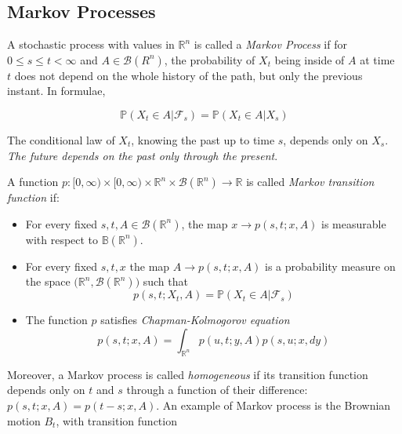 \subsection{Markov Processes}
A stochastic process with values in $\mathbb{R}^n$ is called a \textit{Markov Process} if for $0 \leq s \leq t < \infty$ and $A \in \mathcal{B}(R^n)$, the probability of $X_t$ being inside of $A$ at time $t$ does not depend on the whole history of the path, but only the previous instant. In formulae,

\begin{equation}
    \mathbb{P}(X_t \in A \vert \mathcal{F}_s) = \mathbb{P}(X_t \in A \vert X_s)
\end{equation}

The conditional law of $X_t$, knowing the past up to time $s$, depends only on $X_s$. \textit{The future depends on the past only through the present}. 

\begin{definition}
    A function $p : [0,\infty) \times [0,\infty) \times \mathbb{R}^n \times \mathcal{B}(\mathbb{R}^n) \to \mathbb{R}$ is called \textit{Markov transition function} if:
    \begin{itemize}
        \item For every fixed $s,t, A \in \mathcal{B}(\mathbb{R}^n)$, the map $x \to p(s,t;x,A)$ is measurable with respect to $\mathbb{B}(\mathbb{R}^n)$. 
        \item For every fixed $s,t,x$ the map $A \to p(s,t;x,A)$ is a probability measure on the space $\big(\mathbb{R}^n, \mathcal{B}(\mathbb{R}^n)\big)$ such that
        \begin{equation}
            p(s,t;X_t,A) = \mathbb{P}(X_t \in A \vert \mathcal{F}_s)
        \end{equation}
        \item The function $p$ satisfies \textit{Chapman-Kolmogorov equation}
        \begin{equation}
            p(s,t;x,A) = \int_{\mathbb{R}^n} p(u,t;y,A) p(s,u;x,dy)
        \end{equation}
    \end{itemize}
\end{definition}

Moreover, a Markov process is called \textit{homogeneous} if its transition function depends only on $t$ and $s$ through a function of their difference: $p(s,t;x,A) = p(t-s;x,A)$. An example of Markov process is the Brownian motion $B_t$, with transition function

